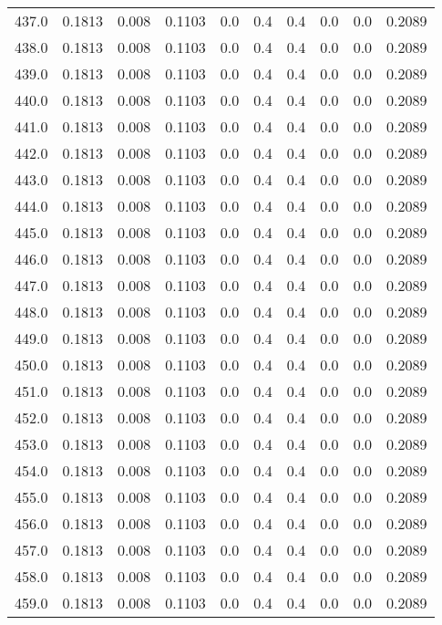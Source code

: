 \begin{longtable}{lrrrrrrrrr}
437.0 & 0.1813 & 0.008 & 0.1103 & 0.0 & 0.4 & 0.4 & 0.0 & 0.0 & 0.2089 \\
438.0 & 0.1813 & 0.008 & 0.1103 & 0.0 & 0.4 & 0.4 & 0.0 & 0.0 & 0.2089 \\
439.0 & 0.1813 & 0.008 & 0.1103 & 0.0 & 0.4 & 0.4 & 0.0 & 0.0 & 0.2089 \\
440.0 & 0.1813 & 0.008 & 0.1103 & 0.0 & 0.4 & 0.4 & 0.0 & 0.0 & 0.2089 \\
441.0 & 0.1813 & 0.008 & 0.1103 & 0.0 & 0.4 & 0.4 & 0.0 & 0.0 & 0.2089 \\
442.0 & 0.1813 & 0.008 & 0.1103 & 0.0 & 0.4 & 0.4 & 0.0 & 0.0 & 0.2089 \\
443.0 & 0.1813 & 0.008 & 0.1103 & 0.0 & 0.4 & 0.4 & 0.0 & 0.0 & 0.2089 \\
444.0 & 0.1813 & 0.008 & 0.1103 & 0.0 & 0.4 & 0.4 & 0.0 & 0.0 & 0.2089 \\
445.0 & 0.1813 & 0.008 & 0.1103 & 0.0 & 0.4 & 0.4 & 0.0 & 0.0 & 0.2089 \\
446.0 & 0.1813 & 0.008 & 0.1103 & 0.0 & 0.4 & 0.4 & 0.0 & 0.0 & 0.2089 \\
447.0 & 0.1813 & 0.008 & 0.1103 & 0.0 & 0.4 & 0.4 & 0.0 & 0.0 & 0.2089 \\
448.0 & 0.1813 & 0.008 & 0.1103 & 0.0 & 0.4 & 0.4 & 0.0 & 0.0 & 0.2089 \\
449.0 & 0.1813 & 0.008 & 0.1103 & 0.0 & 0.4 & 0.4 & 0.0 & 0.0 & 0.2089 \\
450.0 & 0.1813 & 0.008 & 0.1103 & 0.0 & 0.4 & 0.4 & 0.0 & 0.0 & 0.2089 \\
451.0 & 0.1813 & 0.008 & 0.1103 & 0.0 & 0.4 & 0.4 & 0.0 & 0.0 & 0.2089 \\
452.0 & 0.1813 & 0.008 & 0.1103 & 0.0 & 0.4 & 0.4 & 0.0 & 0.0 & 0.2089 \\
453.0 & 0.1813 & 0.008 & 0.1103 & 0.0 & 0.4 & 0.4 & 0.0 & 0.0 & 0.2089 \\
454.0 & 0.1813 & 0.008 & 0.1103 & 0.0 & 0.4 & 0.4 & 0.0 & 0.0 & 0.2089 \\
455.0 & 0.1813 & 0.008 & 0.1103 & 0.0 & 0.4 & 0.4 & 0.0 & 0.0 & 0.2089 \\
456.0 & 0.1813 & 0.008 & 0.1103 & 0.0 & 0.4 & 0.4 & 0.0 & 0.0 & 0.2089 \\
457.0 & 0.1813 & 0.008 & 0.1103 & 0.0 & 0.4 & 0.4 & 0.0 & 0.0 & 0.2089 \\
458.0 & 0.1813 & 0.008 & 0.1103 & 0.0 & 0.4 & 0.4 & 0.0 & 0.0 & 0.2089 \\
459.0 & 0.1813 & 0.008 & 0.1103 & 0.0 & 0.4 & 0.4 & 0.0 & 0.0 & 0.2089 \\

\end{longtable}
